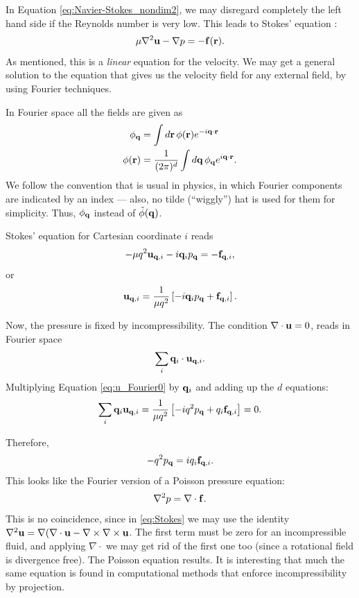 In Equation \ref{eq:Navier-Stokes_nondim2}, we may disregard
completely the left hand side if the Reynolds number is very low. This
leads to Stokes' equation :
\begin{equation}
  \label{eq:Stokes}
  \mu \nabla^2 \mathbf{u} -\nabla p = - \mathbf{f}(\mathbf{r}) .
\end{equation}
As mentioned, this is a \emph{linear} equation for the velocity.  We
may get a general solution to the equation that gives us the velocity
field for any external field, by using Fourier techniques.

In Fourier space all the fields are given as 
\begin{align}
  \label{eq:F_r_to_q}
  \phi_{\mathbf{q}} &=                    \int d\mathbf{r} \, \phi(\mathbf{r}) e^{-i\mathbf{q}\cdot\mathbf{r}}  \\
  \label{eq:F_q_to_r}
  \phi(\mathbf{r}) &= \frac 1{(2\pi)^d}  \int d\mathbf{q} \, \phi_{\mathbf{q}} e^{ i\mathbf{q}\cdot\mathbf{r}} .
\end{align}
We follow the convention that is usual in physics, in which Fourier
components are indicated by an index --- also, no tilde (``wiggly'')
hat is used for them for simplicity. Thus, $ \phi_{\mathbf{q}} $ instead of
$ \tilde{\phi}(\mathbf{q}) $.

Stokes' equation for Cartesian coordinate $i$ reads
\cite{bray2002theory}
\[
-\mu q^2 \mathbf{u}_{\mathbf{q},i} - i \mathbf{q}_i p_{\mathbf{q}} = - \mathbf{f}_{\mathbf{q},i} ,
\]
or
\begin{equation}
\label{eq:u_Fourier0}
\mathbf{u}_{\mathbf{q},i} = \frac 1{\mu q^2}
\left[
  - i \mathbf{q}_i p_{\mathbf{q}} + \mathbf{f}_{\mathbf{q},i} 
\right] .
\end{equation}

Now, the pressure is fixed by incompressibility. The condition
$\nabla\cdot\mathbf{u}=0$, reads in Fourier space
\[
  \sum_i\mathbf{q}_i\cdot\mathbf{u}_{\mathbf{q},i} .
\]
Multiplying Equation \ref{eq:u_Fourier0} by $\mathbf{q}_i$ and adding up the
$d$ equations:
\[
\sum_i \mathbf{q}_i \mathbf{u}_{\mathbf{q},i} = \frac 1{\mu q^2}
\left[
  - i q^2 p_{\mathbf{q}} + q_i\mathbf{f}_{\mathbf{q},i} 
\right] =0 .
\]

Therefore,
\[
  - q^2 p_{\mathbf{q}} = i q_i\mathbf{f}_{\mathbf{q},i}   .
\]
This looks like the Fourier version of a Poisson pressure equation:
\[
  \nabla^2 p = \nabla\cdot \mathbf{f} .
\]
This is no coincidence, since in \ref{eq:Stokes} we may use the
identity
\(\nabla^2 \mathbf{u} = \nabla(\nabla\cdot\mathbf{u} -
\nabla\times\nabla\times\mathbf{u} \). The first term must be zero for an
incompressible fluid, and applying $\nabla\cdot$ we may get rid of the
first one too (since a rotational field is divergence free). The
Poisson equation results. It is interesting that much the same
equation is found in computational methods that enforce
incompressibility by projection.

